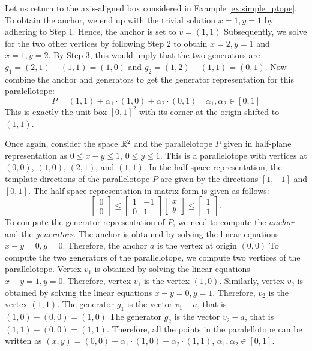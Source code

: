 \begin{example}
Let us return to the axis-aligned box considered in Example \ref{ex:simple_ptope}.
%
To obtain the anchor, we end up with the trivial solution $x = 1, y=1$ by adhering to Step 1. Hence, the anchor is set to $v = (1,1)$
%
Subsequently, we solve for the two other vertices by following Step 2 to obtain $x=2, y= 1$ and $x=1,y=2$.
%
By Step 3, this would imply that the two generators are $g_1 = (2,1)-(1,1) = (1,0)$ and $g_2 = (1,2)-(1,1) = (0,1)$.
%
Now combine the anchor and generators to get the generator representation for this paralellotope:
%
\begin{equation}
 P = (1,1) + \alpha_1\cdot(1,0) + \alpha_2\cdot(0,1) \quad \alpha_1, \alpha_2 \in [0,1]
\end{equation}
%
This is exactly the unit box $[0,1]^2$ with its corner at the origin shifted to $(1,1)$.
\end{example}
%
\begin{example}
\label{ex:diag_ptope}
Once again, consider the space ${\mathbb{R}}^2$ and the parallelotope $P$ given in half-plane representation as $0 \leq x-y \leq 1$, $0 \leq y \leq 1$.
%
This is a parallelotope with vertices at $(0,0)$, $(1,0)$, $(2,1)$, and $(1,1)$.
%
In the half-space representation, the template directions of the parallelotope $P$ are given by the directions $[1, -1]$ and $[0, 1]$.
%
The half-space representation in matrix form is given as follows:
%
\begin{equation}
  \begin{bmatrix} 0 \\ 0 \end{bmatrix} \leq \begin{bmatrix}  1 & -1 \\ 0 &  1 \end{bmatrix}  \begin{bmatrix} x \\ y \end{bmatrix} \leq \begin{bmatrix} 1 \\ 1 \end{bmatrix}. \label{eq:ptopeexample}
\end{equation}
%
To compute the generator representation of $P$, we need to compute the \emph{anchor} and the \emph{generators}.
%
The anchor is obtained by solving the linear equations $x-y = 0, y = 0$.
%
Therefore, the anchor $a$ is the vertex at origin $(0,0)$
%
To compute the two generators of the parallelotope, we compute two vertices of the parallelotope.
%
Vertex $v_1$ is obtained by solving the linear equations $x - y = 1, y = 0$.
%
Therefore, vertex $v_1$ is the vertex $(1,0)$.
%
Similarly, vertex $v_2$ is obtained by solving the linear equations $x-y = 0, y = 1$.
%
Therefore, $v_2$ is the vertex $(1,1)$.
%
The generator $g_1$ is the vector $v_1 - a$, that is $(1,0)- (0,0) = (1,0)$
%
The generator $g_2$ is the vector $v_2 - a$, that is $(1,1) - (0,0) = (1,1)$.
%
Therefore, all the points in the paralellotope can be written as $(x,y) = (0,0) + \alpha_1 \cdot (1,0) + \alpha_2\cdot (1,1)$, $\alpha_1, \alpha_2 \in [0,1]$.
\end{example}

